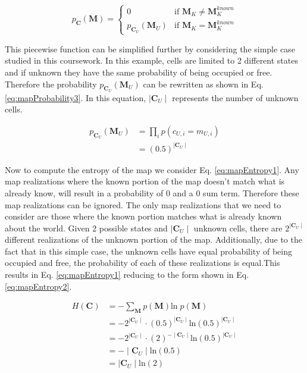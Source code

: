 \documentclass[a4paper,12pt]{article}
\begin{document}
			\[
				p_\textbf{C}(\textbf{M}) =
				\begin{cases}
					0 										& \text{if $\textbf{M}_K \neq \textbf{M}_K^{known}$} \\
					p_{\textbf{C}_U}(\textbf{M}_U) 			& \text{if $\textbf{M}_K = \textbf{M}_K^{known}$} 
				\end{cases}
			\]
			
			This piecewise function can be simplified further by considering the simple case studied in this coursework. In this example, cells are limited to 2 different states and if unknown they have the same probability of being occupied or free. Therefore the probability $p_{\textbf{C}_U}(\textbf{M}_U)$ can be rewritten as shown in Eq. \ref{eq:mapProbability3}. In this equation, $\mid \textbf{C}_U \mid$ represents the number of unknown cells. 

			\begin{equation}
				\begin{split}
					p_{\textbf{C}_U}(\textbf{M}_U) &= \prod_{i} p(c_{U,i} = m_{U,i}) \\
					&= \left(0.5\right)^{\mid \textbf{C}_U \mid}
				\end{split}
				\label{eq:mapProbability3}
			\end{equation}

			Now to compute the entropy of the map we consider Eq. \ref{eq:mapEntropy1}. Any map realizations where the known portion of the map doesn't match what is already know, will result in a probability of 0 and a 0 sum term. Therefore these map realizations can be ignored. The only map realizations that we need to consider are those where the known portion matches what is already known about the world. Given 2 possible states and $\mid \textbf{C}_U \mid$ unknown cells, there are $2^{\mid \textbf{C}_U \mid}$ different realizations of the unknown portion of the map. Additionally, due to the fact that in this simple case, the unknown cells have equal probability of being occupied and free, the probability of each of these realizations is equal.This results in Eq. \ref{eq:mapEntropy1} reducing to the form shown in Eq. \ref{eq:mapEntropy2}.

			\begin{equation}
				\begin{split}
					H \left(\textbf{C}\right) &= - \sum_{\textbf{M}} p\left(\textbf{M}\right)\text{ln} \; p\left(\textbf{M}\right) \\
					&= - 2^{\mid \textbf{C}_U \mid} \cdot \left(0.5\right)^{\mid \textbf{C}_U \mid} \text{ln} \left(0.5\right)^{\mid \textbf{C}_U \mid} \\
					&= - 2^{\mid \textbf{C}_U \mid} \cdot \left(2\right)^{-\mid \textbf{C}_U \mid} \text{ln} \left(0.5\right)^{\mid \textbf{C}_U \mid} \\
					&= - \mid \textbf{C}_U \mid \text{ln} \left(0.5\right) \\
					&= \mid \textbf{C}_U \mid \text{ln} \left(2\right)
				\end{split}
				\label{eq:mapEntropy2}
			\end{equation}
\end{document}
